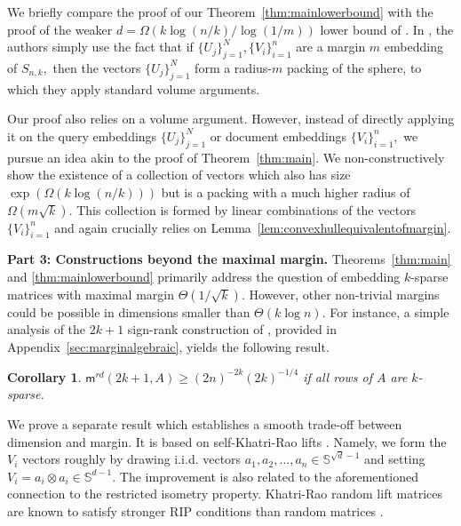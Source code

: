 \documentclass[preprint]{article}
\newtheorem{corollary}{Corollary}[]
\newcommand{\maxmargin}{\mathsf{m}^{rd}}
\newcommand{\ksparsen}{S_{n,k}}
\begin{document}
We briefly compare the proof of our Theorem~\ref{thm:mainlowerbound} with the proof of the weaker $d=\Omega(k\log(n/k)/\log(1/m))$ lower bound of \cite{weller2025theoretical}. In \cite{weller2025theoretical}, the authors simply use the fact that if $\{U_j\}_{j = 1}^N, \{V_i\}_{i = 1}^n$ are a margin $m$ embedding of $\ksparsen,$ then the vectors $\{U_j\}_{j = 1}^N$ form a radius-$m$ packing of the sphere, to which they apply standard volume arguments. 

Our proof also relies on a volume argument. However, instead of directly applying it on the query embeddings $\{U_j\}_{j = 1}^N$ or document embeddings $\{V_i\}_{i = 1}^n,$ we pursue an idea akin to the proof of Theorem~\ref{thm:main}. We non-constructively show the existence of a collection of vectors which also has size $\exp(\Omega(k\log(n/k)))$ but is a packing with a much higher radius of $\Omega(m\sqrt{k}).$ This collection is formed by linear combinations of the vectors $\{V_i\}_{i = 1}^n$ and again crucially relies on Lemma~\ref{lem:convexhullequivalentofmargin}. 

\textbf{Part 3: Constructions beyond the maximal margin.} Theorems~\ref{thm:main} and \ref{thm:mainlowerbound} primarily address the question of embedding $k$-sparse matrices with maximal margin $\Theta(1/\sqrt{k}).$ However, other non-trivial margins could be possible in dimensions smaller than $\Theta(k\log n).$ For instance, a simple analysis of the $2k+1$ sign-rank construction of \cite{AlonFranklRodl1985}, provided in Appendix~\ref{sec:marginalgebraic}, yields the following result.

\begin{corollary}
\label{cor:marginalgebraic}
    $\maxmargin(2k+1, A)\ge (2n)^{-2k}(2k)^{-1/4}$ if all rows of $A$ are $k$-sparse.
\end{corollary}

We prove a separate result which establishes a smooth trade-off between dimension and margin. It is based on self-Khatri-Rao lifts \cite{khatri1968solutions}. Namely, we form the $V_i$ vectors roughly by drawing i.i.d. vectors $a_1, a_2, \ldots, a_n \in \mathbb{S}^{\sqrt{d}-1}$ and setting $V_i = a_i\otimes a_i\in \mathbb{S}^{d-1}.$ The improvement is also related to the aforementioned connection to the restricted isometry property. Khatri-Rao random lift matrices are known to satisfy stronger RIP conditions than random matrices \cite{khanna18khatrirao}. 
\end{document}
